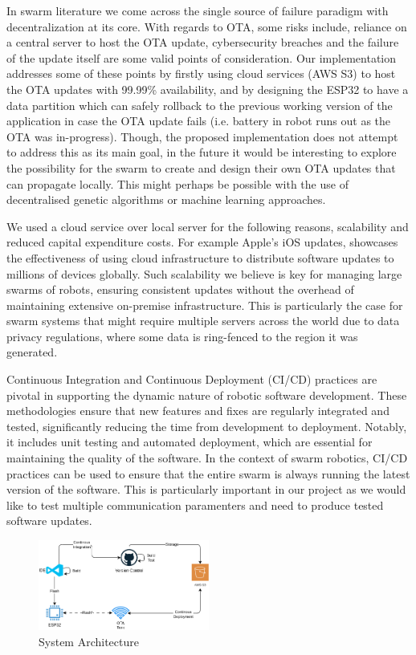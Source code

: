\documentclass{report}
\begin{document}
In swarm literature we come across the single source of failure paradigm with decentralization at its core. With regards to OTA, some risks include, reliance on a central server to host the OTA update, cybersecurity breaches and the failure of the update itself are some valid points of consideration. Our implementation addresses some of these points by firstly using cloud services (AWS S3) to host the OTA updates with 99.99\% availability, and by designing the ESP32 to have a data partition which can safely rollback to the previous working version of the application in case the OTA update fails (i.e. battery in robot runs out as the OTA was in-progress). Though, the proposed implementation does not attempt to address this as its main goal, in the future it would be interesting to explore the possibility for the swarm to create and design their own OTA updates that can propagate locally. This might perhaps be possible with the use of decentralised genetic algorithms or machine learning approaches. %

We used a cloud service over local server for the following reasons, scalability and reduced capital expenditure costs. For example Apple’s iOS updates, showcases the effectiveness of using cloud infrastructure to distribute software updates to millions of devices globally. Such scalability we believe is key for managing large swarms of robots, ensuring consistent updates without the overhead of maintaining extensive on-premise infrastructure. This is particularly the case for swarm systems that might require multiple servers across the world due to data privacy regulations, where some data is ring-fenced to the region it was generated. %

Continuous Integration and Continuous Deployment (CI/CD) practices are pivotal in supporting the dynamic nature of robotic software development. These methodologies ensure that new features and fixes are regularly integrated and tested, significantly reducing the time from development to deployment. Notably, it includes unit testing and automated deployment, which are essential for maintaining the quality of the software. In the context of swarm robotics, CI/CD practices can be used to ensure that the entire swarm is always running the latest version of the software. This is particularly important in our project as we would like to test multiple communication paramenters and need to produce tested software updates. %


\begin{figure}[h]
    \centering
    \includegraphics[width=0.5\textwidth]{architecture.png}
    \caption{System Architecture}
    \label{fig:architecture}
\end{figure}
\end{document}
